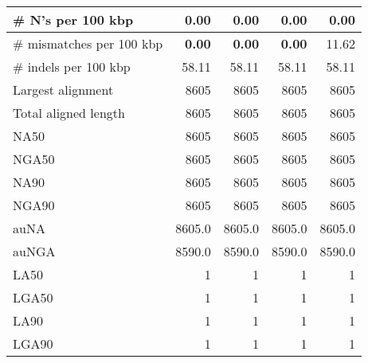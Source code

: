 \documentclass[12pt,a4paper]{article}
\begin{document}
\begin{table}[ht]
\begin{center}
\begin{tabular}{|l*{4}{|r}|}
\# N's per 100 kbp & 0.00 & 0.00 & 0.00 & 0.00 \\ \hline
\# mismatches per 100 kbp & {\bf 0.00} & {\bf 0.00} & {\bf 0.00} & 11.62 \\ \hline
\# indels per 100 kbp & 58.11 & 58.11 & 58.11 & 58.11 \\ \hline
Largest alignment & 8605 & 8605 & 8605 & 8605 \\ \hline
Total aligned length & 8605 & 8605 & 8605 & 8605 \\ \hline
NA50 & 8605 & 8605 & 8605 & 8605 \\ \hline
NGA50 & 8605 & 8605 & 8605 & 8605 \\ \hline
NA90 & 8605 & 8605 & 8605 & 8605 \\ \hline
NGA90 & 8605 & 8605 & 8605 & 8605 \\ \hline
auNA & 8605.0 & 8605.0 & 8605.0 & 8605.0 \\ \hline
auNGA & 8590.0 & 8590.0 & 8590.0 & 8590.0 \\ \hline
LA50 & 1 & 1 & 1 & 1 \\ \hline
LGA50 & 1 & 1 & 1 & 1 \\ \hline
LA90 & 1 & 1 & 1 & 1 \\ \hline
LGA90 & 1 & 1 & 1 & 1 \\ \hline
\end{tabular}
\end{center}
\end{table}
\end{document}
